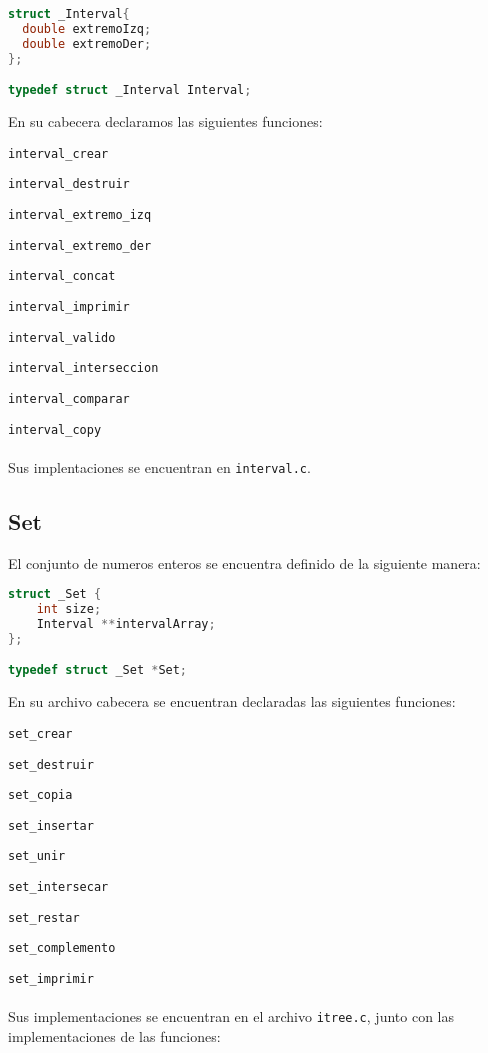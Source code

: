 \documentclass[]{article}
\begin{document}
\begin{lstlisting}[language=C]
struct _Interval{
  double extremoIzq;
  double extremoDer;
};

typedef struct _Interval Interval;
\end{lstlisting}
En su cabecera declaramos las siguientes funciones:

\verb|interval_crear|

\verb|interval_destruir|

\verb|interval_extremo_izq|

\verb|interval_extremo_der|

\verb|interval_concat|

\verb|interval_imprimir|

\verb|interval_valido|

\verb|interval_interseccion|

\verb|interval_comparar|

\verb|interval_copy|\\\\
Sus implentaciones se encuentran en \verb|interval.c|.\\

\subsection{Set}
El conjunto de numeros enteros se encuentra definido de la siguiente manera:

\begin{lstlisting}[language=C]
struct _Set {
    int size;
    Interval **intervalArray;
};

typedef struct _Set *Set;

\end{lstlisting}
En su archivo cabecera se encuentran declaradas las siguientes funciones:

\verb|set_crear|

\verb|set_destruir|

\verb|set_copia|

\verb|set_insertar|

\verb|set_unir|

\verb|set_intersecar|

\verb|set_restar|

\verb|set_complemento|

\verb|set_imprimir|\\\\
Sus implementaciones se encuentran en el archivo \verb|itree.c|, junto con las implementaciones de las funciones:\\
\end{document}
